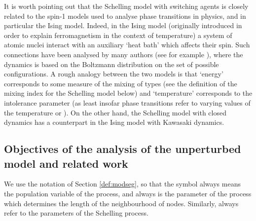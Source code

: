 \documentclass[11pt]{article}
\theoremstyle{plain}
\numberwithin{equation}{subsection}
\begin{document}
It is worth pointing out that the Schelling model with switching agents
is closely related to the spin-1 models used to analyse phase transitions in physics, and in
particular the Ising model. Indeed, in the Ising model (originally introduced in order to explain
ferromagnetism in the context of temperature) a system of atomic nuclei interact with an 
auxiliary `heat bath' which affects their spin. Such connections have been analysed by many authors
(see for example \cite{SS,DM,PW,GVN,GO}), where the dynamics is based on
the Boltzmann distribution on the set of possible configurations. A rough analogy between
the two models is that `energy'  corresponds to  some measure of the mixing of types
(see the definition of the mixing index for the Schelling model below) and `temperature' 
corresponds to the intolerance parameter  (as least insofar phase transitions refer to
varying values of the temperature or ). On the other hand, 
the Schelling model with closed dynamics has a counterpart in the
Ising model with Kawasaki dynamics.

\subsection{Objectives of the analysis of the unperturbed model and related work}
\label{sub:knownressch}
\label{se:1Dmorphojob}
We use the notation of Section \ref{def:modseg}, so that 
the symbol  always means the population
variable of the process, and  always is the parameter of the process which
determines the length of the neighbourhood of nodes. Similarly, 
always refer to the parameters of the Schelling process.
\end{document}
